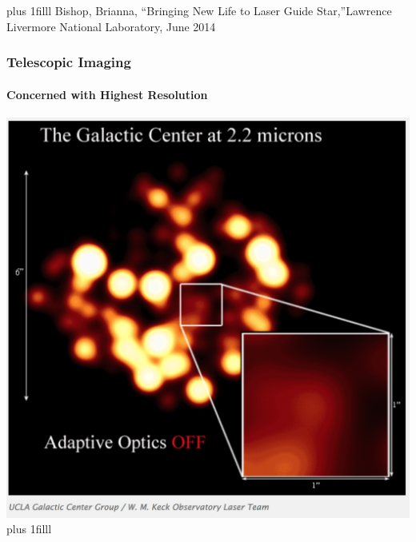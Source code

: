 \documentclass{beamer}
\newcommand{\btVFill}{\vskip0pt plus 1filll}
\begin{document}
{
	\begin{frame}
	  \color{white}
	  \bigskip
	  \btVFill
	  {\tiny{Bishop, Brianna, ``Bringing New Life to Laser Guide Star,''Lawrence Livermore National Laboratory, June 2014}}

	\end{frame}
 } 

\begin{frame}
  \frametitle{Telescopic Imaging}
  \framesubtitle{Concerned with Highest Resolution}
  \center
  \includegraphics[scale = .3]{Images/galaxywoao.png}
	  \bigskip
	  \btVFill

\end{frame}
\end{document}
